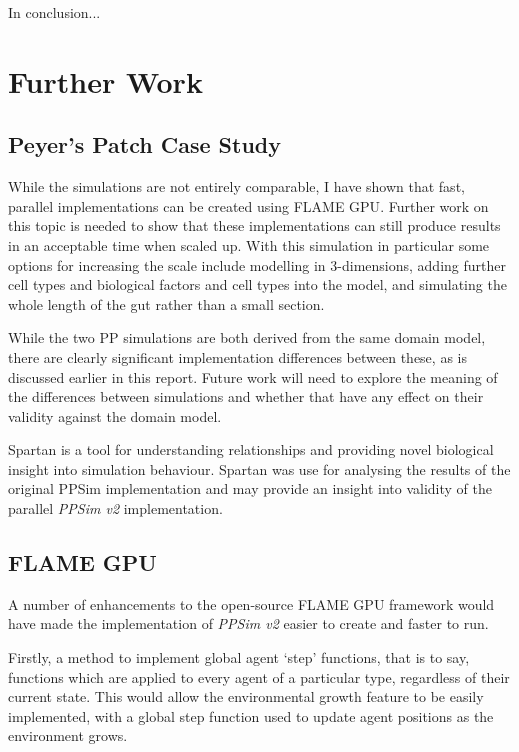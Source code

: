 \documentclass{UoYCSproject}
\begin{document}
In conclusion...

\section{Further Work}
\subsection{Peyer's Patch Case Study}
While the simulations are not entirely comparable, I have shown that fast, parallel implementations can be created using \gls{FLAME GPU}.
Further work on this topic is needed to show that these implementations can still produce results in an acceptable time when scaled up.
With this simulation in particular some options for increasing the scale include modelling in 3-dimensions, adding further cell types and biological factors and cell types into the model, and simulating the whole length of the gut rather than a small section.

While the two \gls{PP} simulations are both derived from the same domain model, there are clearly significant implementation differences between these, as is discussed earlier in this report.
Future work will need to explore the meaning of the differences between simulations and whether that have any effect on their validity against the domain model.

Spartan is a tool for understanding relationships and providing novel biological insight into simulation behaviour.
Spartan was use for analysing the results of the original PPSim implementation\cite{spartan} and may provide an insight into validity of the parallel \textit{PPSim v2} implementation.

\subsection{\gls{FLAME GPU}}
A number of enhancements to the open-source \gls{FLAME GPU} framework would have made the implementation of \textit{PPSim v2} easier to create and faster to run.

Firstly, a method to implement global agent `step' functions, that is to say, functions which are applied to every agent of a particular type, regardless of their current state.
This would allow the environmental growth feature to be easily implemented, with a global step function used to update agent positions as the environment grows.
\end{document}
